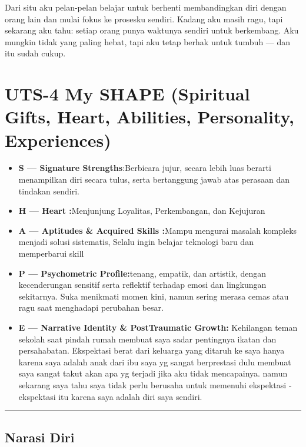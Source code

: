 \documentclass[
  letterpaper,
  DIV=11,
  numbers=noendperiod]{scrreprt}
\providecommand{\tightlist}{%
  \setlength{\itemsep}{0pt}\setlength{\parskip}{0pt}}
\begin{document}
Dari situ aku pelan-pelan belajar untuk berhenti membandingkan diri
dengan orang lain dan mulai fokus ke prosesku sendiri. Kadang aku masih
ragu, tapi sekarang aku tahu: setiap orang punya waktunya sendiri untuk
berkembang. Aku mungkin tidak yang paling hebat, tapi aku tetap berhak
untuk tumbuh --- dan itu sudah cukup.


\chapter{UTS-4 My SHAPE (Spiritual Gifts, Heart, Abilities, Personality,
Experiences)}\label{uts-4-my-shape-spiritual-gifts-heart-abilities-personality-experiences}

\begin{itemize}
\tightlist
\item
  \textbf{S --- Signature Strengths}:Berbicara jujur, secara lebih luas
  berarti menampilkan diri secara tulus, serta bertanggung jawab atas
  perasaan dan tindakan sendiri.
\item
  \textbf{H --- Heart :}Menjunjung Loyalitas, Perkembangan, dan
  Kejujuran
\item
  \textbf{A --- Aptitudes \& Acquired Skills :}Mampu mengurai masalah
  kompleks menjadi solusi sistematis, Selalu ingin belajar teknologi
  baru dan memperbarui skill
\item
  \textbf{P --- Psychometric Profile:}tenang, empatik, dan artistik,
  dengan kecenderungan sensitif serta reflektif terhadap emosi dan
  lingkungan sekitarnya. Suka menikmati momen kini, namun sering merasa
  cemas atau ragu saat menghadapi perubahan besar.
\item
  \textbf{E --- Narrative Identity \& PostTraumatic Growth:} Kehilangan
  teman sekolah saat pindah rumah membuat saya sadar pentingnya ikatan
  dan persahabatan. Ekspektasi berat dari keluarga yang ditaruh ke saya
  hanya karena saya adalah anak dari ibu saya yg sangat berprestasi dulu
  membuat saya sangat takut akan apa yg terjadi jika aku tidak
  mencapainya. namun sekarang saya tahu saya tidak perlu berusaha untuk
  memenuhi ekspektasi - ekspektasi itu karena saya adalah diri saya
  sendiri.
\end{itemize}

\begin{center}\rule{0.5\linewidth}{0.5pt}\end{center}

\section{Narasi Diri}\label{narasi-diri}
\end{document}
